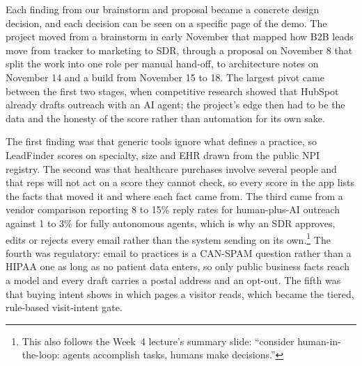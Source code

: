 \documentclass[11pt]{article}
\begin{document}
Each finding from our brainstorm and proposal became a concrete design decision, and each decision can be seen on a specific page of the demo. The project moved from a brainstorm in early November that mapped how B2B leads move from tracker to marketing to SDR, through a proposal on November 8 that split the work into one role per manual hand-off, to architecture notes on November 14 and a build from November 15 to 18. The largest pivot came between the first two stages, when competitive research showed that HubSpot already drafts outreach with an AI agent; the project's edge then had to be the data and the honesty of the score rather than automation for its own sake.

The first finding was that generic tools ignore what defines a practice, so LeadFinder scores on specialty, size and EHR drawn from the public NPI registry. The second was that healthcare purchases involve several people and that reps will not act on a score they cannot check, so every score in the app lists the facts that moved it and where each fact came from. The third came from a vendor comparison reporting 8 to 15\% reply rates for human-plus-AI outreach against 1 to 3\% for fully autonomous agents, which is why an SDR approves, edits or rejects every email rather than the system sending on its own.\footnote{This also follows the Week~4 lecture's summary slide: ``consider human-in-the-loop: agents accomplish tasks, humans make decisions.''} The fourth was regulatory: email to practices is a CAN-SPAM question rather than a HIPAA one as long as no patient data enters, so only public business facts reach a model and every draft carries a postal address and an opt-out. The fifth was that buying intent shows in which pages a visitor reads, which became the tiered, rule-based visit-intent gate.
\end{document}
